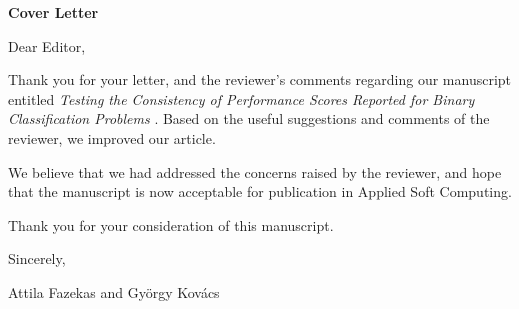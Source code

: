 \documentclass{article}
\begin{document}
\begin{center}
{
\Large\bf
Cover Letter
}
\end{center}
\bigskip

\bigskip 

Dear Editor,

\bigskip
Thank you for your letter, and the reviewer's comments regarding our manuscript entitled  {\it Testing the Consistency of Performance Scores Reported for Binary Classification Problems }. Based on the useful suggestions and comments of the reviewer, we improved our article. 

We believe that we had addressed the concerns raised by the reviewer, and hope that the manuscript is now acceptable for publication in Applied Soft Computing.

Thank you for your consideration of this manuscript. 

\bigskip
Sincerely,

\medskip
Attila Fazekas and Gy\"orgy Kov\'acs
\end{document}
